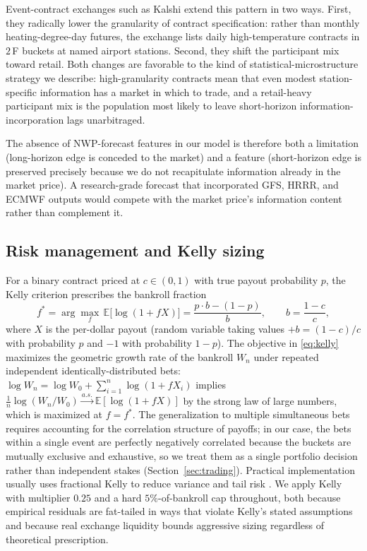 \documentclass[11pt]{article}
\begin{document}
Event-contract exchanges such as Kalshi extend this pattern in two ways.
First, they radically lower the granularity of contract specification:
rather than monthly heating-degree-day futures, the exchange lists daily
high-temperature contracts in $2$\,\textdegree F buckets at named airport
stations. Second, they shift the participant mix toward retail.
Both changes are favorable to the kind of statistical-microstructure
strategy we describe: high-granularity contracts mean that even modest
station-specific information has a market in which to trade, and a
retail-heavy participant mix is the population most likely to leave
short-horizon information-incorporation lags unarbitraged.

The absence of NWP-forecast features in our model is therefore both a
limitation (long-horizon edge is conceded to the market) and a feature
(short-horizon edge is preserved precisely because we do not recapitulate
information already in the market price). A research-grade forecast that
incorporated GFS, HRRR, and ECMWF outputs would compete with the market
price's information content rather than complement it.

\subsection{Risk management and Kelly sizing}

For a binary contract priced at $c \in (0,1)$ with true payout probability
$p$, the Kelly criterion \citep{kelly1956new,merton1969lifetime} prescribes
the bankroll fraction
\begin{equation}
f^* = \arg\max_f \, \mathbb{E}\bigl[\log(1 + f X)\bigr] = \frac{p \cdot b - (1-p)}{b}, \qquad b = \frac{1-c}{c},
\label{eq:kelly}
\end{equation}
where $X$ is the per-dollar payout (random variable taking values
$+b = (1-c)/c$ with probability $p$ and $-1$ with probability $1-p$).
The objective in \eqref{eq:kelly} maximizes the geometric growth rate of
the bankroll $W_n$ under repeated independent identically-distributed bets:
$\log W_n = \log W_0 + \sum_{i=1}^{n} \log(1 + f X_i)$ implies
$\frac{1}{n} \log(W_n / W_0) \xrightarrow{a.s.} \mathbb{E}[\log(1 + fX)]$
by the strong law of large numbers, which is maximized at $f = f^*$. The
generalization to multiple simultaneous bets requires accounting for the
correlation structure of payoffs; in our case, the bets within a single
event are perfectly negatively correlated because the buckets are
mutually exclusive and exhaustive, so we treat them as a single
portfolio decision rather than independent stakes (Section~\ref{sec:trading}).
Practical implementation usually uses fractional Kelly to reduce variance
and tail risk \citep{thorp2006kelly}. We apply Kelly with multiplier
$0.25$ and a hard $5\%$-of-bankroll cap throughout, both because empirical
residuals are fat-tailed in ways that violate Kelly's stated assumptions
\citep{kahneman1979prospect} and because real exchange liquidity bounds
aggressive sizing regardless of theoretical prescription.
\end{document}
